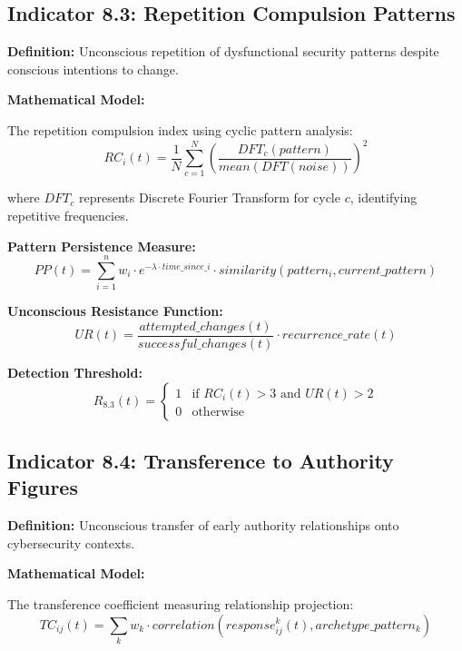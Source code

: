 \documentclass[11pt,a4paper]{article}
\begin{document}
\subsection{Indicator 8.3: Repetition Compulsion Patterns}

\textbf{Definition:} Unconscious repetition of dysfunctional security patterns despite conscious intentions to change.

\textbf{Mathematical Model:}

The repetition compulsion index using cyclic pattern analysis:
\begin{equation}
RC_i(t) = \frac{1}{N} \sum_{c=1}^{N} \left(\frac{DFT_c(pattern)}{mean(DFT(noise))}\right)^2
\end{equation}

where $DFT_c$ represents Discrete Fourier Transform for cycle $c$, identifying repetitive frequencies.

\textbf{Pattern Persistence Measure:}
\begin{equation}
PP(t) = \sum_{i=1}^{n} w_i \cdot e^{-\lambda \cdot time\_since\_i} \cdot similarity(pattern_i, current\_pattern)
\end{equation}

\textbf{Unconscious Resistance Function:}
\begin{equation}
UR(t) = \frac{attempted\_changes(t)}{successful\_changes(t)} \cdot recurrence\_rate(t)
\end{equation}

\textbf{Detection Threshold:}
\begin{equation}
R_{8.3}(t) = \begin{cases}
1 & \text{if } RC_i(t) > 3 \text{ and } UR(t) > 2 \\
0 & \text{otherwise}
\end{cases}
\end{equation}

\subsection{Indicator 8.4: Transference to Authority Figures}

\textbf{Definition:} Unconscious transfer of early authority relationships onto cybersecurity contexts.

\textbf{Mathematical Model:}

The transference coefficient measuring relationship projection:
\begin{equation}
TC_{ij}(t) = \sum_{k} w_k \cdot correlation(response_{ij}^k(t), archetype\_pattern_k)
\end{equation}
\end{document}
